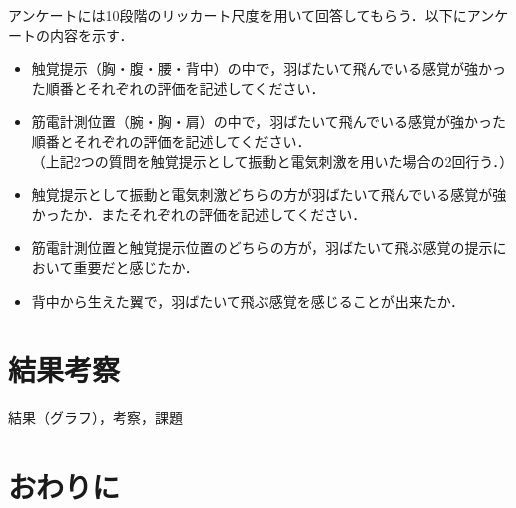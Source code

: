         アンケートには10段階のリッカート尺度\cite{lickert1932method}を用いて回答してもらう．以下にアンケートの内容を示す．
        \begin{itemize}
        \item 触覚提示（胸・腹・腰・背中）の中で，羽ばたいて飛んでいる感覚が強かった順番とそれぞれの評価を記述してください．
        \item 筋電計測位置（腕・胸・肩）の中で，羽ばたいて飛んでいる感覚が強かった順番とそれぞれの評価を記述してください．\\
        （上記2つの質問を触覚提示として振動と電気刺激を用いた場合の2回行う．）
        \item  触覚提示として振動と電気刺激どちらの方が羽ばたいて飛んでいる感覚が強かったか．またそれぞれの評価を記述してください．
        \item 筋電計測位置と触覚提示位置のどちらの方が，羽ばたいて飛ぶ感覚の提示において重要だと感じたか．
        \item 背中から生えた翼で，羽ばたいて飛ぶ感覚を感じることが出来たか．
        \end{itemize}

        
\section{結果考察}
        結果（グラフ），考察，課題

\section{おわりに}



